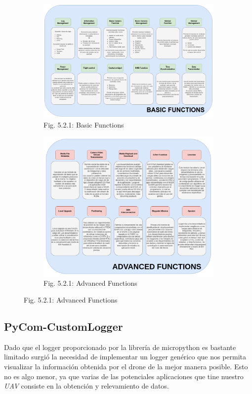 \documentclass[12pt]{article}
\begin{document}
\begin{figure}[ht]
  \centering
  \begin{subfigure}[a]{1\linewidth}
    \includegraphics[width=\linewidth]{images/basic_function.png}
    \caption{Fig. 5.2.1: Basic Functions}
  \end{subfigure}
  \begin{subfigure}[b]{1\linewidth}
    \includegraphics[width=\linewidth]{images/advanced_function.png}
    \caption{Fig. 5.2.1: Advanced Functions}
  \end{subfigure}
\end{figure}

\subsection{PyCom-CustomLogger}
Dado que el logger proporcionado por la librería de micropython es bastante limitado surgió la necesidad de implementar un logger genérico que nos permita visualizar la información obtenida por el drone de la mejor manera posible. Esto no es algo menor, ya que varias de las potenciales aplicaciones que tine nuestro \textit{UAV} consiste en la obtención y relevamiento de datos.
\end{document}
